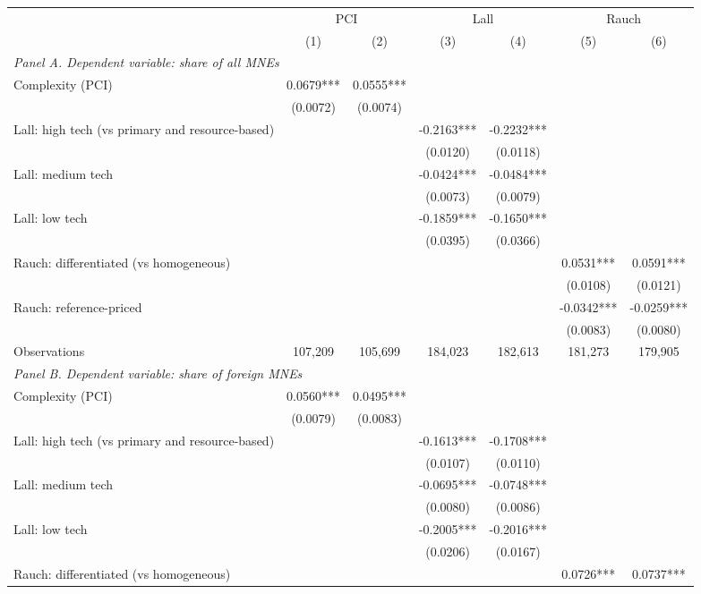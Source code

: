 \begin{tabular}{lcccccc} \hline
 & \multicolumn{2}{c}{PCI} & \multicolumn{2}{c}{Lall} & \multicolumn{2}{c}{Rauch} \\
 & (1) & (2) & (3) & (4) & (5) & (6) \\ \hline
\multicolumn{7}{l}{\textit{Panel A. Dependent variable: share of all MNEs}} \\
Complexity (PCI) & 0.0679*** & 0.0555*** &  &  &  &  \\
 & (0.0072) & (0.0074) &  &  &  &  \\
Lall: high tech (vs primary and resource-based) &  &  & -0.2163*** & -0.2232*** &  &  \\
 &  &  & (0.0120) & (0.0118) &  &  \\
Lall: medium tech &  &  & -0.0424*** & -0.0484*** &  &  \\
 &  &  & (0.0073) & (0.0079) &  &  \\
Lall: low tech &  &  & -0.1859*** & -0.1650*** &  &  \\
 &  &  & (0.0395) & (0.0366) &  &  \\
Rauch: differentiated (vs homogeneous) &  &  &  &  & 0.0531*** & 0.0591*** \\
 &  &  &  &  & (0.0108) & (0.0121) \\
Rauch: reference-priced &  &  &  &  & -0.0342*** & -0.0259*** \\
 &  &  &  &  & (0.0083) & (0.0080) \\
Observations & 107,209 & 105,699 & 184,023 & 182,613 & 181,273 & 179,905 \\
\midrule
\multicolumn{7}{l}{\textit{Panel B. Dependent variable: share of foreign MNEs}} \\
Complexity (PCI) & 0.0560*** & 0.0495*** &  &  &  &  \\
 & (0.0079) & (0.0083) &  &  &  &  \\
Lall: high tech (vs primary and resource-based) &  &  & -0.1613*** & -0.1708*** &  &  \\
 &  &  & (0.0107) & (0.0110) &  &  \\
Lall: medium tech &  &  & -0.0695*** & -0.0748*** &  &  \\
 &  &  & (0.0080) & (0.0086) &  &  \\
Lall: low tech &  &  & -0.2005*** & -0.2016*** &  &  \\
 &  &  & (0.0206) & (0.0167) &  &  \\
Rauch: differentiated (vs homogeneous) &  &  &  &  & 0.0726*** & 0.0737*** \\

\end{tabular}
